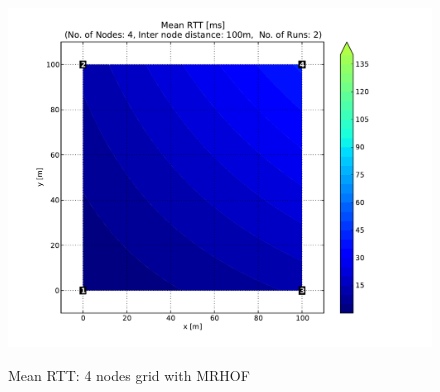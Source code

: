 \begin{figure}[htbp]
{      \includegraphics[scale=0.23]{Pics/results/4/MRHOF/grid/dist100_montecarlo_contour.pdf}}
  \caption{Mean RTT: 4 nodes grid with MRHOF}
 \label{fig:rtt_4_grid_mrhof}
\end{figure}
      
